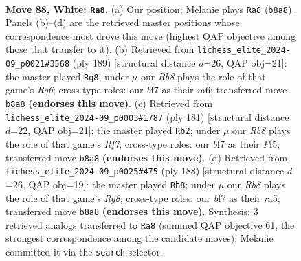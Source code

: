 \documentclass[11pt]{article}
\begin{document}
\clearpage

\begin{figure}[p]\centering
\begin{subfigure}{0.46\textwidth}\centering
\resizebox{\linewidth}{!}{%
\newchessgame
\chessboard[
  setfen={1R6/2k2br1/8/1P2R3/4K3/8/8/8 w - - 3 88},
  showmover=false,
  pgfstyle=straightmove, color=movearrow, markmove={b8-a8}
]}
\caption{}
\end{subfigure}\hfill
\begin{subfigure}{0.46\textwidth}\centering
\resizebox{\linewidth}{!}{%
\newchessgame
\chessboard[
  setfen={8/8/R7/8/8/6rp/5K1k/8 b - - 43 95},
  showmover=false,
  pgfstyle=straightmove, color=movearrow, markmove={g3-g8}
]}
\caption{}
\end{subfigure}
\\[4pt]
\begin{subfigure}{0.46\textwidth}\centering
\resizebox{\linewidth}{!}{%
\newchessgame
\chessboard[
  setfen={8/8/R7/5p2/8/5pk1/5r2/4K3 b - - 39 91},
  showmover=false,
  pgfstyle=straightmove, color=movearrow, markmove={f2-b2}
]}
\caption{}
\end{subfigure}\hfill
\begin{subfigure}{0.46\textwidth}\centering
\resizebox{\linewidth}{!}{%
\newchessgame
\chessboard[
  setfen={6R1/5k2/8/r7/8/8/5PK1/8 w - - 23 95},
  showmover=false,
  pgfstyle=straightmove, color=movearrow, markmove={g8-b8}
]}
\caption{}
\end{subfigure}
\caption{\textbf{Move 88, White: \texttt{Ra8}.} (a) Our position; Melanie plays \texttt{Ra8} (\texttt{b8a8}). Panels (b)--(d) are the retrieved master positions whose correspondence most drove this move (highest QAP objective among those that transfer to it). (b) Retrieved from \texttt{lichess\_elite\_2024-09\_p0021\#3568} (ply 189) [structural distance $d$=26, QAP obj=21]: the master played \texttt{Rg8}; under $\mu$ our \emph{Rb8} plays the role of that game's \emph{Rg6}; cross-type roles: our \emph{b}f7 as their \emph{r}a6; transferred move \texttt{b8a8} \textbf{(endorses this move)}. (c) Retrieved from \texttt{lichess\_elite\_2024-09\_p0003\#1787} (ply 181) [structural distance $d$=22, QAP obj=21]: the master played \texttt{Rb2}; under $\mu$ our \emph{Rb8} plays the role of that game's \emph{Rf7}; cross-type roles: our \emph{b}f7 as their \emph{P}f5; transferred move \texttt{b8a8} \textbf{(endorses this move)}. (d) Retrieved from \texttt{lichess\_elite\_2024-09\_p0025\#475} (ply 188) [structural distance $d$=26, QAP obj=19]: the master played \texttt{Rb8}; under $\mu$ our \emph{Rb8} plays the role of that game's \emph{Rg8}; cross-type roles: our \emph{b}f7 as their \emph{r}a5; transferred move \texttt{b8a8} \textbf{(endorses this move)}. Synthesis: 3 retrieved analogs transferred to \texttt{Ra8} (summed QAP objective 61, the strongest correspondence among the candidate moves); Melanie committed it via the \texttt{search} selector.}
\label{fig:thought-m174}
\end{figure}
\end{document}
